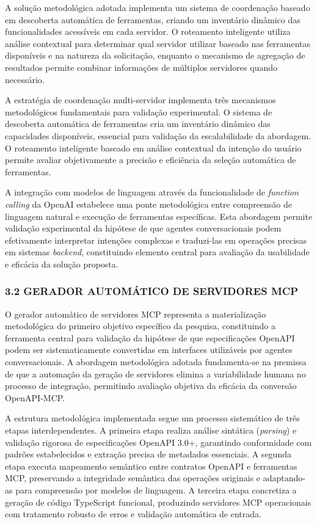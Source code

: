 \documentclass[
]{article}
\begin{document}
A solução metodológica adotada implementa um sistema de coordenação
baseado em descoberta automática de ferramentas, criando um inventário
dinâmico das funcionalidades acessíveis em cada servidor. O roteamento
inteligente utiliza análise contextual para determinar qual servidor
utilizar baseado nas ferramentas disponíveis e na natureza da
solicitação, enquanto o mecanismo de agregação de resultados permite
combinar informações de múltiplos servidores quando necessário.

A estratégia de coordenação multi-servidor implementa três mecanismos
metodológicos fundamentais para validação experimental. O sistema de
descoberta automática de ferramentas cria um inventário dinâmico das
capacidades disponíveis, essencial para validação da escalabilidade da
abordagem. O roteamento inteligente baseado em análise contextual da
intenção do usuário permite avaliar objetivamente a precisão e
eficiência da seleção automática de ferramentas.

A integração com modelos de linguagem através da funcionalidade de
\emph{function calling} da OpenAI estabelece uma ponte metodológica
entre compreensão de linguagem natural e execução de ferramentas
específicas. Esta abordagem permite validação experimental da hipótese
de que agentes conversacionais podem efetivamente interpretar intenções
complexas e traduzi-las em operações precisas em sistemas
\emph{backend}, constituindo elemento central para avaliação da
usabilidade e eficácia da solução proposta.

\subsubsection{3.2 GERADOR AUTOMÁTICO DE SERVIDORES
MCP}\label{gerador-automuxe1tico-de-servidores-mcp}

O gerador automático de servidores MCP representa a materialização
metodológica do primeiro objetivo específico da pesquisa, constituindo a
ferramenta central para validação da hipótese de que especificações
OpenAPI podem ser sistematicamente convertidas em interfaces utilizáveis
por agentes conversacionais. A abordagem metodológica adotada
fundamenta-se na premissa de que a automação da geração de servidores
elimina a variabilidade humana no processo de integração, permitindo
avaliação objetiva da eficácia da conversão OpenAPI-MCP.

A estrutura metodológica implementada segue um processo sistemático de
três etapas interdependentes. A primeira etapa realiza análise sintática
(\emph{parsing}) e validação rigorosa de especificações OpenAPI 3.0+,
garantindo conformidade com padrões estabelecidos e extração precisa de
metadados essenciais. A segunda etapa executa mapeamento semântico entre
contratos OpenAPI e ferramentas MCP, preservando a integridade semântica
das operações originais e adaptando-as para compreensão por modelos de
linguagem. A terceira etapa concretiza a geração de código TypeScript
funcional, produzindo servidores MCP operacionais com tratamento robusto
de erros e validação automática de entrada.
\end{document}
